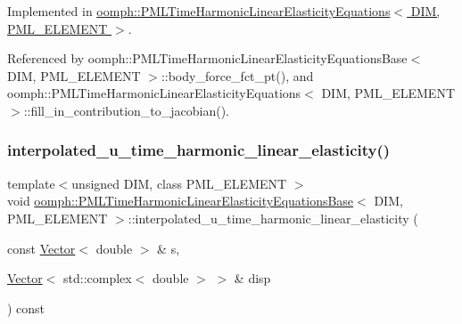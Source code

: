 Implemented in \hyperlink{classoomph_1_1PMLTimeHarmonicLinearElasticityEquations_a81f0d12fb13d9fe3d1daab709b3bd012}{oomph\+::\+P\+M\+L\+Time\+Harmonic\+Linear\+Elasticity\+Equations$<$ D\+I\+M, P\+M\+L\+\_\+\+E\+L\+E\+M\+E\+N\+T $>$}.



Referenced by oomph\+::\+P\+M\+L\+Time\+Harmonic\+Linear\+Elasticity\+Equations\+Base$<$ D\+I\+M, P\+M\+L\+\_\+\+E\+L\+E\+M\+E\+N\+T $>$\+::body\+\_\+force\+\_\+fct\+\_\+pt(), and oomph\+::\+P\+M\+L\+Time\+Harmonic\+Linear\+Elasticity\+Equations$<$ D\+I\+M, P\+M\+L\+\_\+\+E\+L\+E\+M\+E\+N\+T $>$\+::fill\+\_\+in\+\_\+contribution\+\_\+to\+\_\+jacobian().

\mbox{\label{classoomph_1_1PMLTimeHarmonicLinearElasticityEquationsBase_a8e283b20e8f893de8fd89b91043a0d9d}} 
\subsubsection{\texorpdfstring{interpolated\+\_\+u\+\_\+time\+\_\+harmonic\+\_\+linear\+\_\+elasticity()}{interpolated\_u\_time\_harmonic\_linear\_elasticity()}\hspace{0.1cm}{\footnotesize\ttfamily [1/2]}}
{\footnotesize\ttfamily template$<$unsigned D\+IM, class P\+M\+L\+\_\+\+E\+L\+E\+M\+E\+NT $>$ \\
void \hyperlink{classoomph_1_1PMLTimeHarmonicLinearElasticityEquationsBase}{oomph\+::\+P\+M\+L\+Time\+Harmonic\+Linear\+Elasticity\+Equations\+Base}$<$ D\+IM, P\+M\+L\+\_\+\+E\+L\+E\+M\+E\+NT $>$\+::interpolated\+\_\+u\+\_\+time\+\_\+harmonic\+\_\+linear\+\_\+elasticity (\begin{DoxyParamCaption}\item[{const \hyperlink{classoomph_1_1Vector}{Vector}$<$ double $>$ \&}]{s,  }\item[{\hyperlink{classoomph_1_1Vector}{Vector}$<$ std\+::complex$<$ double $>$ $>$ \&}]{disp }\end{DoxyParamCaption}) const\hspace{0.3cm}{\ttfamily [inline]}}



